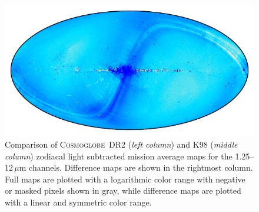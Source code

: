 \documentclass{aa}
\def\Cosmoglobe{\textsc{Cosmoglobe}}
\begin{document}
\begin{figure}
        \includegraphics[width=0.33\linewidth]{figs/diff_CG_DIRBE_ZSMA_05_n256.pdf}
	\caption{Comparison of \Cosmoglobe\ DR2 (\emph{left column}) and K98 (\emph{middle column}) zodiacal light subtracted mission average maps for the 1.25--12$\,\mu$m channels. Difference maps are shown in the rightmost column. Full maps are plotted with a logarithmic color range with negative or masked pixels shown in gray, while difference maps are plotted with a linear and symmetric color range.}
	\label{fig:freqmaps_cg_vs_dirbe1}
\end{figure}
\end{document}
